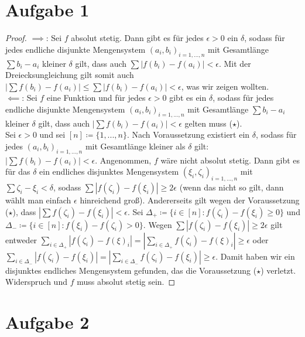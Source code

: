\documentclass[a4paper]{article}
\theoremstyle{plain}
\begin{document}
\section*{Aufgabe 1}
\begin{proof}
	$\implies$:
	Sei $f$ absolut stetig. Dann gibt es für jedes $\epsilon > 0$ ein $\delta$, sodass für jedes endliche disjunkte Mengensystem $(a_i,b_i)_{i=1,...,n}$ mit Gesamtlänge $\sum b_i-a_i$ kleiner $\delta$ gilt, dass auch $\sum |f(b_i) - f(a_i)| < \epsilon$. Mit der Dreiecksungleichung gilt somit auch $|\sum f(b_i) - f(a_i)| \leq \sum |f(b_i) - f(a_i)| < \epsilon$, was wir zeigen wollten.\\
	
	$\impliedby$: Sei $f$ eine Funktion und für jedes $\epsilon > 0$ gibt es ein $\delta$, sodass für jedes endliche disjunkte Mengensystem $(a_i,b_i)_{i=1,...,n}$ mit Gesamtlänge $\sum b_i-a_i$ kleiner $\delta$ gilt, dass auch $|\sum f(b_i) - f(a_i)| < \epsilon$ gelten muss ($\star$). \\
	
	Sei $\epsilon > 0$ und sei $[n] \coloneqq \{1,...,n\}$. Nach Voraussetzung existiert ein $\delta$, sodass für jedes $(a_i,b_i)_{i=1,...,n}$ mit Gesamtlänge kleiner als $\delta$ gilt: $|\sum f(b_i)-f(a_i)| < \epsilon$. Angenommen, $f$ wäre nicht absolut stetig. Dann gibt es für das $\delta$ ein endliches disjunktes Mengensystem $(\xi_i, \zeta_i)_{i=1,...,n}$ mit $\sum \zeta_i - \xi_i < \delta$, sodass $\sum |f(\zeta_i) - f(\xi_i)| \geq 2\epsilon$ (wenn das nicht so gilt, dann wählt man einfach $\epsilon$ hinreichend groß). Andererseits gilt wegen der Voraussetzung ($\star$), dass $|\sum f(\zeta_i) - f(\xi_i)| < \epsilon$. Sei $\Delta_+ \coloneqq \{ i \in [n] : f(\zeta_i) - f(\xi_i) \geq 0 \}$ und $\Delta_- \coloneqq \{ i \in [n] : f(\xi_i) - f(\zeta_i) > 0 \}$. Wegen $\sum |f(\zeta_i) - f(\xi_i)| \geq 2\epsilon$ gilt entweder $\sum_{i \in \Delta_+} |f(\zeta_i) - f(\xi)_i| = |\sum_{i \in \Delta_+} f(\zeta_i) - f(\xi)_i| \geq \epsilon$ oder $\sum_{i \in \Delta_-} |f(\zeta_i) - f(\xi_i)| = |\sum_{i \in \Delta_-} f(\zeta_i) - f(\xi_i)| \geq \epsilon$. Damit haben wir ein disjunktes endliches Mengensystem gefunden, das die Voraussetzung  ($\star$) verletzt. Widerspruch und $f$ muss absolut stetig sein.
\end{proof}

\section*{Aufgabe 2}
\end{document}

